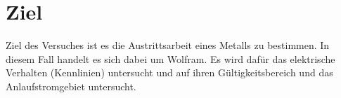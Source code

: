 \section{Ziel}
\label{sec:Ziel}

Ziel des Versuches ist es die Austrittsarbeit eines Metalls zu bestimmen.
In diesem Fall handelt es sich dabei um Wolfram.
Es wird dafür das elektrische Verhalten (Kennlinien) untersucht und auf
ihren Gültigkeitsbereich und das Anlaufstromgebiet untersucht. 